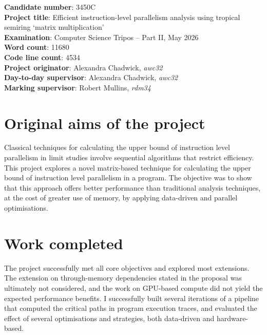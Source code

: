 \documentclass[12pt,a4paper,oneside]{report}
\theoremstyle{definition}
\begin{document}
\textbf{Candidate number}: 3450C \\
\textbf{Project title}: Efficient instruction-level parallelism analysis using tropical semiring `matrix multiplication' \\
\textbf{Examination}: Computer Science Tripos -- Part II, May 2026  \\
\textbf{Word count}: 11680 \footnotemark[1]\\
\textbf{Code line count}: 4534 \footnotemark[2]\\
\textbf{Project originator}: Alexandra Chadwick, \textit{awc32} \\
\textbf{Day-to-day supervisor}: Alexandra Chadwick, \textit{awc32}\\
\textbf{Marking supervisor}: Robert Mullins, \textit{rdm34}\\



\endgroup

\section*{Original aims of the project}

Classical techniques for calculating the upper bound of instruction level parallelism in limit studies involve 
sequential algorithms that restrict efficiency.
This project explores a novel matrix-based technique for calculating the upper bound of instruction level parallelism
in a program. The objective was to show that this approach offers better performance than traditional analysis
techniques, at the cost of greater use of memory, by applying data-driven and parallel optimisations.

\section*{Work completed}

The project successfully met all core objectives and explored most extensions. The extension on through-memory dependencies 
stated in the proposal was ultimately not considered, and the work on GPU-based compute did not yield the expected 
performance benefits. I successfully built several iterations of a pipeline that computed the critical paths in program 
execution traces, and evaluated the effect of several optimisations and strategies, both data-driven and hardware-based.
\end{document}
